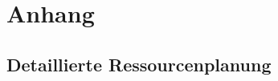 
\section{Anhang}
\label{sec:anhang}

\subsection{Detaillierte Ressourcenplanung}
\label{subsec:ressourcenplanung}


